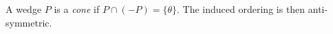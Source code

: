 A wedge $P$ is a \emph{cone} if $P\cap(-P)=\{\theta\}$. The induced ordering is then anti-symmetric.
